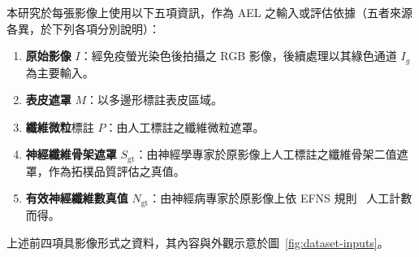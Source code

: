 本研究於每張影像上使用以下五項資訊，作為 AEL 之輸入或評估依據（五者來源各異，於下列各項分別說明）：

\begin{enumerate}
  \item \textbf{原始影像} $I$：經免疫螢光染色後拍攝之 RGB 影像，後續處理以其綠色通道 $I_g$ 為主要輸入。
  \item \textbf{表皮遮罩} $M$：以多邊形標註表皮區域。
  \item \textbf{纖維微粒}標註 $P$：由人工標註之纖維微粒遮罩。
  \item \textbf{神經纖維骨架遮罩} $S_{\text{gt}}$：由神經學專家於原影像上人工標註之纖維骨架二值遮罩，作為拓樸品質評估之真值。
  \item \textbf{有效神經纖維數真值} $N_{\text{gt}}$：由神經病專家於原影像上依 EFNS 規則~\cite{lauria2010skinbiopsy} 人工計數而得。
\end{enumerate}

上述前四項具影像形式之資料，其內容與外觀示意於圖~\ref{fig:dataset-inputs}。


